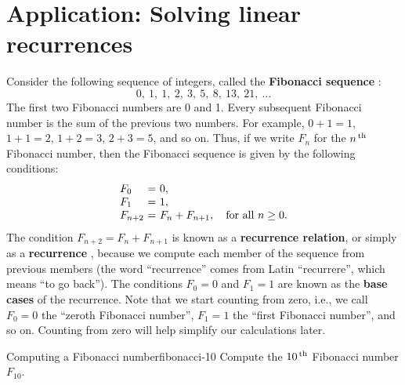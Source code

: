 \section{Application: Solving linear recurrences}

Consider the following sequence of integers, called the
\textbf{Fibonacci sequence}%
%
%
:
\begin{equation*}
  0,\ 1,\ 1,\ 2,\ 3,\ 5,\ 8,\ 13,\ 21,\ \ldots
\end{equation*}
The first two Fibonacci numbers are 0 and 1. Every subsequent
Fibonacci number is the sum of the previous two numbers. For example,
$0+1=1$, $1+1=2$, $1+2=3$, $2+3=5$, and so on. Thus, if we write $F_n$ for the
$n^{\,\rm th}$ Fibonacci number, then the Fibonacci sequence is given by the
following conditions:
\begin{equation*}
  \begin{array}{l@{~}c@{~}l}
    F_0 &=& 0, \\
    F_1 &=& 1, \\
    F_{n+2} &=& F_{n} + F_{n+1}, \quad\mbox{for all $n\geq 0$.}\\
  \end{array}
\end{equation*}
The condition $F_{n+2} = F_{n} + F_{n+1}$ is known as a
\textbf{recurrence relation}, or simply as a \textbf{recurrence}%
, because we compute each member of the sequence
from previous members (the word ``recurrence'' comes from Latin
``recurrere'', which means ``to go back''). The conditions $F_0=0$ and
$F_1=1$ are known as the \textbf{base cases}%
%
 of the recurrence. Note that we
start counting from zero, i.e., we call $F_0=0$ the ``zeroth Fibonacci
number'', $F_1=1$ the ``first Fibonacci number'', and so on. Counting
from zero will help simplify our calculations later.

\begin{example}{Computing a Fibonacci number}{fibonacci-10}
  Compute the $10^{\,\rm th}$ Fibonacci number $F_{10}$.
\end{example}

